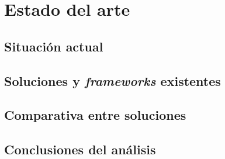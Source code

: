 \chapter{Estado del arte}
\label{ch:state-of-the-art}


\section{Situación actual}

\section{Soluciones y \textit{frameworks} existentes}

\section{Comparativa entre soluciones}

\section{Conclusiones del análisis}
